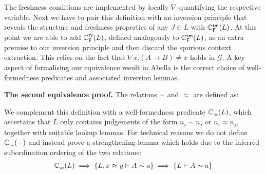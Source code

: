 \documentclass[a4paper,UKenglish]{lipics-v2016}
\newcommand{\ms}{\,}
\newcommand{\mrel}[1]{\mathrel{\ms #1 \ms}}
\newcommand{\istyFh}[1]{\ensuremath{#1\ms\mathsf{ty}}}
\newcommand{\typingFh}[2]{\ensuremath{#1 \mathbin{:_{\mathsf{F}}} #2}}
\newcommand{\tyr}{\mathrel{\sim}}
\newcommand{\tmr}{\mathrel{\approx}}
\newcommand{\lpPi}[1]{\mathbf{\Pi} #1.\ms\ms}
\newcommand{\lpApp}[2]{#1\langle#2\rangle}
\newcommand{\lpImp}{\mrel{=\!\blacktriangleright}}
\newcommand{\Prp}{\ensuremath{\textrm{\textasteriskcentered}}}
\newcommand{\All}{\ensuremath{\forall.\,}}
\newcommand{\Lam}[1]{\ensuremath{\lambda #1.\,}}
\newcommand{\TyLam}{\ensuremath{\Lambda.\,}}
\newcommand{\Prod}[1]{\ensuremath{\Pi #1.\,}}
\newcommand{\emptyctx}{\ensuremath{\bullet}}
\theoremstyle{plain}
\begin{document}
\vspace{-.5em}
{\small
{}
}\vspace{-1em}

The freshness conditions are implemented by locally $\nabla$-quantifying the respective variable.
Next we have to pair this definition with an inversion principle that reveals the structure and freshness properties of any $J \in L$ with $\mathbb{C}_{\mathsf{F}}^{\mathsf{tm}} (L)$.
At this point we are able to add $\mathbb{C}_{\mathsf{F}}^{\mathsf{ty}} (L)$, defined analogously to $\mathbb{C}_{\mathsf{F}}^{\mathsf{tm}} (L)$, as an extra premise to our inversion principle and then discard the spurious context extraction.
This relies on the fact that $\nabla x . (A \to B) \neq x$ holds in $\mathcal{G}$.
A key aspect of formalising our equivalence result in Abella is the correct choice of well-formedness predicates and associated inversion lemmas.

{\bf The second equivalence proof.}
The relations $\tyr$ and $\tmr$ are defined as:

\vspace{-.5em}
{\small
{}
}\vspace{-1em}

We complement this definition with a well-formedness predicate $\ac{\tmr}{~}{L}$, which ascertains that $L$ only contains judgements of the form $n_i \tyr n_j$ or $n_i \tmr n_j$, together with suitable lookup lemmas.
For technical reasons we do not define $\ac{\tyr}{~}{-}$ and instead prove a strengthening lemma which holds due to the inferred subordination ordering of the two relations:
\begin{align*}
  \ac{\tmr}{~}{L} \implies \aj{L, x \tmr y}{A \tyr a} \implies \aj{L}{A \tyr a}
\end{align*}
\end{document}
